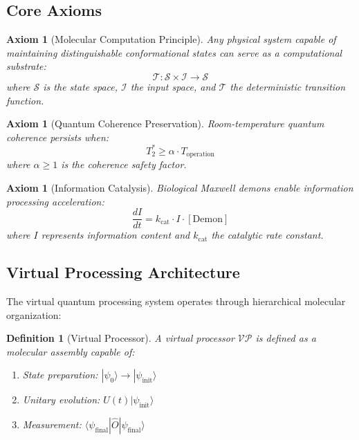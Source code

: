 \documentclass[12pt]{article}
\newtheorem{definition}[theorem]{Definition}
\newtheorem{axiom}[theorem]{Axiom}
\begin{document}
\subsection{Core Axioms}

\begin{axiom}[Molecular Computation Principle]
Any physical system capable of maintaining distinguishable conformational states can serve as a computational substrate:
\begin{equation}
\mathcal{T}: \mathcal{S} \times \mathcal{I} \rightarrow \mathcal{S}
\end{equation}
where $\mathcal{S}$ is the state space, $\mathcal{I}$ the input space, and $\mathcal{T}$ the deterministic transition function.
\end{axiom}

\begin{axiom}[Quantum Coherence Preservation]
Room-temperature quantum coherence persists when:
\begin{equation}
T_{2}^{*} \geq \alpha \cdot T_{\text{operation}}
\end{equation}
where $\alpha \geq 1$ is the coherence safety factor.
\end{axiom}

\begin{axiom}[Information Catalysis]
Biological Maxwell demons enable information processing acceleration:
\begin{equation}
\frac{dI}{dt} = k_{\text{cat}} \cdot I \cdot [\text{Demon}]
\end{equation}
where $I$ represents information content and $k_{\text{cat}}$ the catalytic rate constant.
\end{axiom}

\subsection{Virtual Processing Architecture}

The virtual quantum processing system operates through hierarchical molecular organization:

\begin{definition}[Virtual Processor]
A virtual processor $\mathcal{VP}$ is defined as a molecular assembly capable of:
\begin{enumerate}
\item State preparation: $|\psi_0\rangle \rightarrow |\psi_{\text{init}}\rangle$
\item Unitary evolution: $U(t)|\psi_{\text{init}}\rangle$
\item Measurement: $\langle\psi_{\text{final}}|\hat{O}|\psi_{\text{final}}\rangle$
\end{enumerate}
\end{definition}
\end{document}
